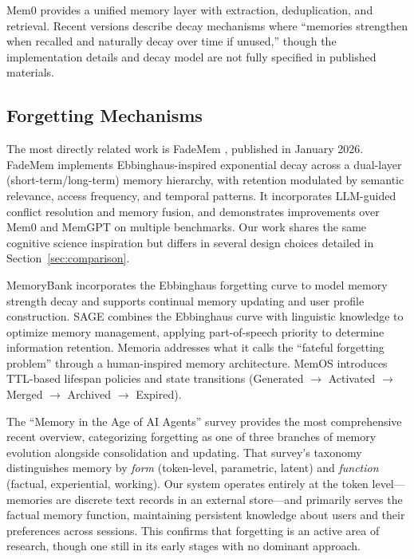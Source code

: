 \documentclass[11pt,a4paper]{article}
\begin{document}
Mem0 \citep{chhikara2024mem0} provides a unified memory layer with extraction, deduplication, and retrieval. Recent versions describe decay mechanisms where ``memories strengthen when recalled and naturally decay over time if unused,'' though the implementation details and decay model are not fully specified in published materials.

\subsection{Forgetting Mechanisms}

The most directly related work is FadeMem \citep{wei2026fademem}, published in January 2026. FadeMem implements Ebbinghaus-inspired exponential decay across a dual-layer (short-term/long-term) memory hierarchy, with retention modulated by semantic relevance, access frequency, and temporal patterns. It incorporates LLM-guided conflict resolution and memory fusion, and demonstrates improvements over Mem0 and MemGPT on multiple benchmarks. Our work shares the same cognitive science inspiration but differs in several design choices detailed in Section~\ref{sec:comparison}.

MemoryBank \citep{zhong2024memorybank} incorporates the Ebbinghaus forgetting curve to model memory strength decay and supports continual memory updating and user profile construction. SAGE \citep{sage2024} combines the Ebbinghaus curve with linguistic knowledge to optimize memory management, applying part-of-speech priority to determine information retention. Memoria \citep{memoria2023} addresses what it calls the ``fateful forgetting problem'' through a human-inspired memory architecture. MemOS \citep{kang2025memos} introduces TTL-based lifespan policies and state transitions (Generated $\rightarrow$ Activated $\rightarrow$ Merged $\rightarrow$ Archived $\rightarrow$ Expired).

The ``Memory in the Age of AI Agents'' survey \citep{liu2025memory} provides the most comprehensive recent overview, categorizing forgetting as one of three branches of memory evolution alongside consolidation and updating. That survey's taxonomy distinguishes memory by \emph{form} (token-level, parametric, latent) and \emph{function} (factual, experiential, working). Our system operates entirely at the token level---memories are discrete text records in an external store---and primarily serves the factual memory function, maintaining persistent knowledge about users and their preferences across sessions. This confirms that forgetting is an active area of research, though one still in its early stages with no dominant approach.
\end{document}
